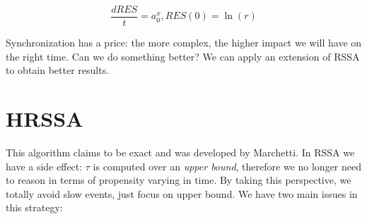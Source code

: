$$\frac{dRES}{t}= a_0^x,RES(0)= \ln(r)$$

Synchronization has a price: the more complex, the higher impact we will have on the right time.
Can we do something better? We can apply an extension of RSSA to obtain better results.

\section{HRSSA}
This algorithm claims to be exact and was developed by Marchetti.
In RSSA we have a side effect: $\tau$ is computed over an \emph{upper bound}, therefore we no longer need to reason in terms of propensity varying in time.
By taking this perspective, we totally avoid slow events, just focus on upper bound.
We have two main issues in this strategy:

